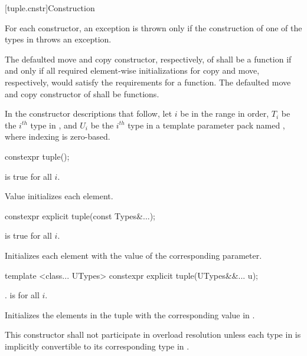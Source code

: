 [tuple.cnstr]{Construction}

\pnum
For each  constructor, an exception is thrown only if the construction of
one of the types in  throws an exception.

\pnum
The defaulted move and copy constructor, respectively, of
 shall be a  function if and only if all
required element-wise initializations for copy and move, respectively,
would satisfy the requirements for a  function. The
defaulted move and copy constructor of  shall be
 functions.

\pnum
In the constructor descriptions that follow, let $i$ be in the range
 in order, $T_i$ be the $i^{th}$ type in , and
$U_i$ be the $i^{th}$ type in a template parameter pack named , where indexing
is zero-based.

%
\begin{itemdecl}
constexpr tuple();
\end{itemdecl}

\begin{itemdescr}
\pnum
\requires {} is true for all $i$.

\pnum
\effects  Value initializes each element.
\end{itemdescr}

%
\begin{itemdecl}
constexpr explicit tuple(const Types&...);
\end{itemdecl}

\begin{itemdescr}
\pnum
\requires {} is true for all $i$.

\pnum
\effects Initializes each element with the value of the
corresponding parameter.
\end{itemdescr}

%
\begin{itemdecl}
template <class... UTypes>
  constexpr explicit tuple(UTypes&&... u);
\end{itemdecl}

\begin{itemdescr}
\pnum
\requires {} \tcode{==} .
 is  for all $i$.

\pnum
\effects Initializes the elements in the tuple with the
corresponding value in .

\pnum
\remark This constructor shall not participate in overload resolution unless each type
in  is implicitly convertible to its corresponding type in .
\end{itemdescr}

